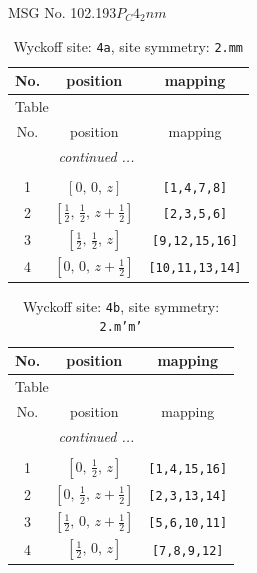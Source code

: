 \documentclass[fleqn,8pt]{jsarticle}
\begin{document}
\setcounter{MaxMatrixCols}{32}

\renewcommand{\tablename}{Table~}
\renewcommand{\figurename}{Figure~}
\begin{center}
\LARGE
MSG No. 102.193\quad$P_{C}4_{2}nm$
\end{center}
\renewcommand{\arraystretch}{1.2}
\begin{longtable}{ccc}
\caption{Wyckoff site: {\tt 4a}, site symmetry: {\tt 2.mm}}
 \\
 \hline \hline
No. & position & mapping \\ \hline \endfirsthead

\multicolumn{2}{l}{\tablename\ \thetable{}} \\
 \hline \hline
No. & position & mapping \\ \hline \endhead

 \hline \hline
\multicolumn{2}{r}{\footnotesize\it continued ...} \\ \endfoot

 \hline \hline
\multicolumn{2}{r}{} \\ \endlastfoot

1 & $\left[ 0,\, 0,\, z \right]$ & {\tt [1,4,7,8]} \\ \hline
2 & $\left[ \frac{1}{2},\, \frac{1}{2},\, z + \frac{1}{2} \right]$ & {\tt [2,3,5,6]} \\ \hline
3 & $\left[ \frac{1}{2},\, \frac{1}{2},\, z \right]$ & {\tt [9,12,15,16]} \\ \hline
4 & $\left[ 0,\, 0,\, z + \frac{1}{2} \right]$ & {\tt [10,11,13,14]} \\
\end{longtable}
\renewcommand{\arraystretch}{1.2}
\begin{longtable}{ccc}
\caption{Wyckoff site: {\tt 4b}, site symmetry: {\tt 2.m'm'}}
 \\
 \hline \hline
No. & position & mapping \\ \hline \endfirsthead

\multicolumn{2}{l}{\tablename\ \thetable{}} \\
 \hline \hline
No. & position & mapping \\ \hline \endhead

 \hline \hline
\multicolumn{2}{r}{\footnotesize\it continued ...} \\ \endfoot

 \hline \hline
\multicolumn{2}{r}{} \\ \endlastfoot

1 & $\left[ 0,\, \frac{1}{2},\, z \right]$ & {\tt [1,4,15,16]} \\ \hline
2 & $\left[ 0,\, \frac{1}{2},\, z + \frac{1}{2} \right]$ & {\tt [2,3,13,14]} \\ \hline
3 & $\left[ \frac{1}{2},\, 0,\, z + \frac{1}{2} \right]$ & {\tt [5,6,10,11]} \\ \hline
4 & $\left[ \frac{1}{2},\, 0,\, z \right]$ & {\tt [7,8,9,12]} \\
\end{longtable}
\end{document}
